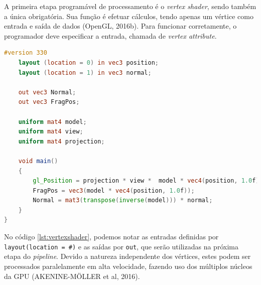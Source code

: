 A primeira etapa programável de processamento é o \textit{vertex shader}, sendo também a única obrigatória. Sua função é efetuar cálculos, tendo apenas um vértice como entrada e saída de dados (OpenGL, 2016b). Para funcionar corretamente, o programador deve especificar a entrada, chamada de \textit{vertex attribute}.

\begin{lstlisting}[language=glsl,
label={lst:vertexshader},
caption="Exemplo de \textit{vertex shader}"]
	#version 330
	layout (location = 0) in vec3 position;
	layout (location = 1) in vec3 normal;
	
	out vec3 Normal;
	out vec3 FragPos;
	
	uniform mat4 model;
	uniform mat4 view;
	uniform mat4 projection;
	
	void main()
	{
		gl_Position = projection * view *  model * vec4(position, 1.0f);
		FragPos = vec3(model * vec4(position, 1.0f));
		Normal = mat3(transpose(inverse(model))) * normal;  
	} 
}
\end{lstlisting}

No código \ref{lst:vertexshader}, podemos notar as entradas definidas por \lstinline{layout(location = #)} e as saídas por \lstinline{out}, que serão utilizadas na próxima etapa do \textit{pipeline}. Devido a natureza independente dos vértices, estes podem ser processados paralelamente em alta velocidade, fazendo uso dos múltiplos núcleos da GPU (AKENINE-MÖLLER et al, 2016).
